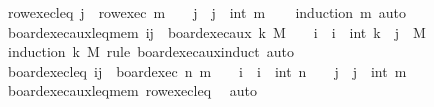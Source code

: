 \begin{isabellebody}
\isadelimdocument
%
\endisadelimdocument
{}\isamarkupfalse%
\ row{\isacharunderscore}{\kern0pt}exec{\isacharunderscore}{\kern0pt}leq{\isacharcolon}{\kern0pt}\ {\isachardoublequoteopen}j\ {\isasymin}\ row{\isacharunderscore}{\kern0pt}exec\ m\ {\isasymlongleftrightarrow}\ {}\ {\isasymle}\ j\ {\isasymand}\ j\ {\isasymle}\ int\ m{\isachardoublequoteclose}\isanewline
%
\isadelimproof
\ \ %
\endisadelimproof
%
\isatagproof
{}\isamarkupfalse%
\ {\isacharparenleft}{\kern0pt}induction\ m{\isacharparenright}{\kern0pt}\ auto%
\endisatagproof
{\isafoldproof}%
%
\isadelimproof
\isanewline
%
\endisadelimproof
\isanewline
{}\isamarkupfalse%
\ board{\isacharunderscore}{\kern0pt}exec{\isacharunderscore}{\kern0pt}aux{\isacharunderscore}{\kern0pt}leq{\isacharunderscore}{\kern0pt}mem{\isacharcolon}{\kern0pt}\ {\isachardoublequoteopen}{\isacharparenleft}{\kern0pt}i{\isacharcomma}{\kern0pt}j{\isacharparenright}{\kern0pt}\ {\isasymin}\ board{\isacharunderscore}{\kern0pt}exec{\isacharunderscore}{\kern0pt}aux\ k\ M\ {\isasymlongleftrightarrow}\ {}\ {\isasymle}\ i\ {\isasymand}\ i\ {\isasymle}\ int\ k\ {\isasymand}\ j\ {\isasymin}\ M{\isachardoublequoteclose}\isanewline
%
\isadelimproof
\ \ %
\endisadelimproof
%
\isatagproof
{}\isamarkupfalse%
\ {\isacharparenleft}{\kern0pt}induction\ k\ M\ rule{\isacharcolon}{\kern0pt}\ board{\isacharunderscore}{\kern0pt}exec{\isacharunderscore}{\kern0pt}aux{\isachardot}{\kern0pt}induct{\isacharparenright}{\kern0pt}\ auto%
\endisatagproof
{\isafoldproof}%
%
\isadelimproof
\isanewline
%
\endisadelimproof
\isanewline
{}\isamarkupfalse%
\ board{\isacharunderscore}{\kern0pt}exec{\isacharunderscore}{\kern0pt}leq{\isacharcolon}{\kern0pt}\ {\isachardoublequoteopen}{\isacharparenleft}{\kern0pt}i{\isacharcomma}{\kern0pt}j{\isacharparenright}{\kern0pt}\ {\isasymin}\ board{\isacharunderscore}{\kern0pt}exec\ n\ m\ {\isasymlongleftrightarrow}\ {}\ {\isasymle}\ i\ {\isasymand}\ i\ {\isasymle}\ int\ n\ {\isasymand}\ {}\ {\isasymle}\ j\ {\isasymand}\ j\ {\isasymle}\ int\ m{\isachardoublequoteclose}\isanewline
%
\isadelimproof
\ \ %
\endisadelimproof
%
\isatagproof
{}\isamarkupfalse%
\ board{\isacharunderscore}{\kern0pt}exec{\isacharunderscore}{\kern0pt}aux{\isacharunderscore}{\kern0pt}leq{\isacharunderscore}{\kern0pt}mem\ row{\isacharunderscore}{\kern0pt}exec{\isacharunderscore}{\kern0pt}leq\ \isamarkupfalse%
\ auto%
\endisatagproof
{\isafoldproof}%
%
\isadelimproof
\isanewline
%
\endisadelimproof
\isanewline
{}\isamarkupfalse%

\end{isabellebody}
